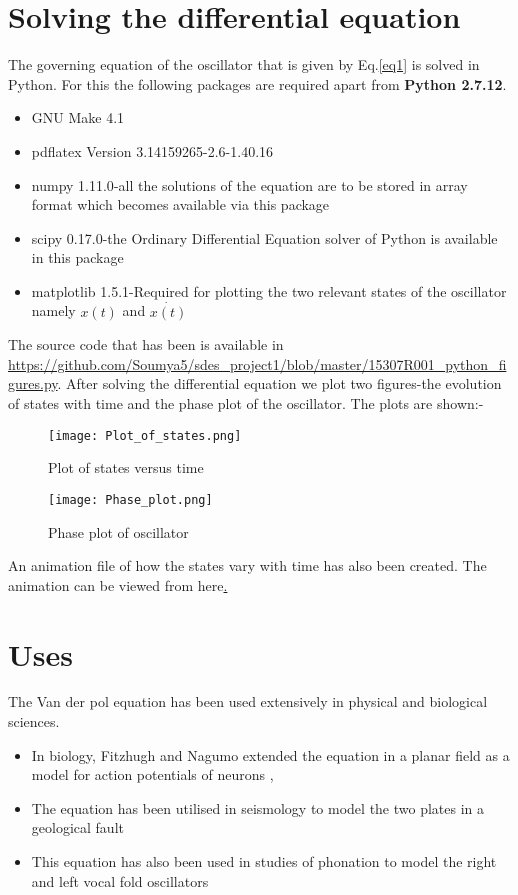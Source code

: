 \documentclass{article}
\begin{document}
\section{Solving the differential equation}
The governing equation of the oscillator that is given by Eq.\ref{eq1} is solved in Python. For this the following packages are required 
apart from \textbf{Python 2.7.12}.
\begin{itemize}
    \item{GNU Make 4.1}
    \item{pdflatex Version 3.14159265-2.6-1.40.16} 
    \item{numpy 1.11.0}-all the solutions of the equation are to be stored in array format which becomes available via this package
    \item{scipy 0.17.0}-the Ordinary Differential Equation solver of Python is available in this package
    \item{matplotlib 1.5.1}-Required for plotting the two relevant states of the oscillator namely $x(t)$ and $\dot{x(t)}$
\end{itemize}
The source code that has been is available in \url{https://github.com/Soumya5/sdes_project1/blob/master/15307R001_python_figures.py}. After solving the differential equation we plot two figures-the evolution of states with time and the phase plot of the oscillator. The plots are shown:-
\begin{figure}[H]
    \centering
    \texttt{[image: Plot\_of\_states.png]}
    \caption{Plot of states versus time}
\end{figure}
\begin{figure}[H]
    \centering
    \texttt{[image: Phase\_plot.png]}
    \caption{Phase plot of oscillator}
\end{figure}
An animation file of how the states vary with time has also been created. The animation can be viewed from here\href{./vanderpol_animation.html}.
\section{Uses}
The Van der pol equation has been used extensively in physical and biological sciences.
\begin{itemize}
    \item In biology, Fitzhugh and Nagumo extended the equation in a planar field as a model for action potentials of neurons \cite{fitz}, \cite{nagumo1962}
    \item The equation has been utilised in seismology to model the two plates in a geological fault \cite{seis}
    \item This equation has also been used in studies of phonation to model the right and left vocal fold oscillators \cite{phonation}
\end{itemize}
{}

\end{document}
